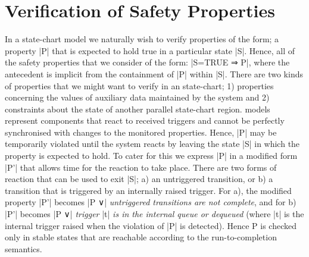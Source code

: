 

\section{Verification of Safety Properties}
\label{sec:verificationSafety}


In a state-chart model we naturally wish to verify properties of the form; a property |P| that is expected to hold true in a particular state |S|.
Hence, all of the safety properties that we consider  of the form: |S=TRUE ⇒ P|, where the antecedent is implicit from the containment of |P| within |S|.
There are two kinds of properties that we might want to verify in an \SCXML state-chart;
1) properties concerning the values of auxiliary data maintained by the system and 
2) constraints about the state of another parallel state-chart region.
\SCXML models represent components that react to received triggers and cannot be perfectly synchronised with changes to the monitored properties. 
Hence, |P| may be temporarily violated until the system reacts by leaving the state |S| in which the property is expected to hold.
To cater for this we express |P| in a modified form |P'| that allows time for the reaction to take place. 
There are two forms of reaction that can be used to exit |S|; 
a) an untriggered transition, or 
b) a transition that is triggered by an internally raised trigger.
For a), the modified property |P'| becomes |P ∨| \emph{untriggered transitions are not complete}, 
and for b) |P'| becomes |P ∨| \emph{trigger} |t| \emph{is in the internal queue or dequeued}
(where |t| is the internal trigger raised when the violation of |P| is detected).
Hence P is checked only in stable states that are reachable according to the run-to-completion semantics.



